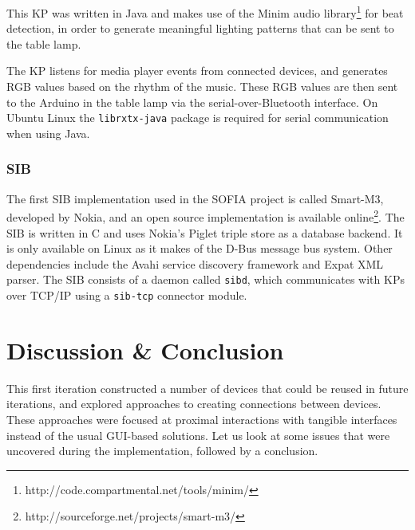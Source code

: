 This \ac{KP} was written in Java and makes use of the Minim audio library\footnote{http://code.compartmental.net/tools/minim/} for beat detection, in order to generate meaningful lighting patterns that can be sent to the table lamp.

The \ac{KP} listens for media player events from connected devices, and generates RGB values based on the rhythm of the music. These RGB values are then sent to the Arduino in the table lamp via the serial-over-Bluetooth interface. On Ubuntu Linux the \texttt{librxtx-java} package is required for serial communication when using Java.


\subsubsection{SIB}

The first \ac{SIB} implementation used in the \ac{SOFIA} project is called Smart-M3, developed by Nokia, and an open source implementation is available online\footnote{http://sourceforge.net/projects/smart-m3/}. The \ac{SIB} is written in C and uses Nokia's Piglet triple store as a database backend. It is only available on Linux as it makes of the D-Bus message bus system. Other dependencies include the Avahi service discovery framework and Expat XML parser.  The \ac{SIB} consists of a daemon called \texttt{sibd}, which communicates with \acp{KP} over TCP/IP using a \texttt{sib-tcp} connector module.  


\section{Discussion \& Conclusion}




This first iteration constructed a number of devices that could be reused in future iterations, and explored approaches to creating connections between devices. These approaches were focused at proximal interactions with tangible interfaces instead of the usual \ac{GUI}-based solutions. Let us look at some issues that were uncovered during the implementation, followed by a conclusion. 

